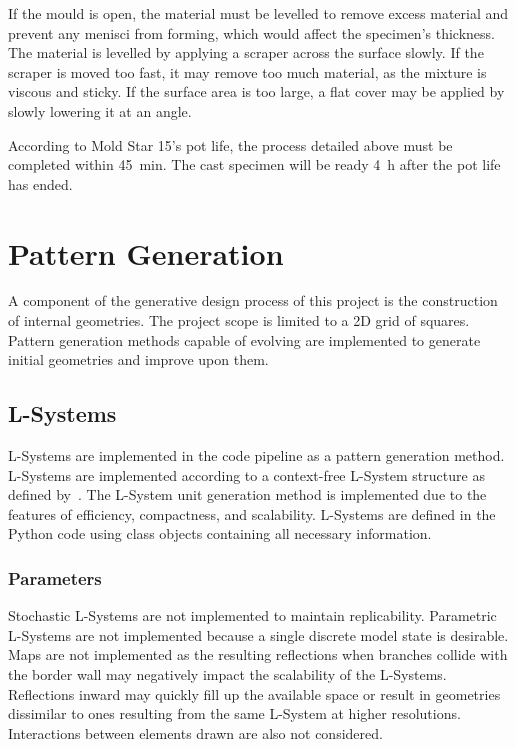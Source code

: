 If the mould is open, the material must be levelled to remove excess material and prevent any menisci from forming, which would affect the specimen's thickness. The material is levelled by applying a scraper across the surface slowly. If the scraper is moved too fast, it may remove too much material, as the mixture is viscous and sticky. If the surface area is too large, a flat cover may be applied by slowly lowering it at an angle.

According to Mold Star 15's pot life, the process detailed above must be completed within \SI{45}{\minute}. The cast specimen will be ready \SI{4}{\hour} after the pot life has ended.

\section{Pattern Generation}

A component of the generative design process of this project is the construction of internal geometries. The project scope is limited to a 2D grid of squares. Pattern generation methods capable of evolving are implemented to generate initial geometries and improve upon them.

\subsection{L-Systems}
\label{ssec:LS}

L-Systems are implemented in the code pipeline as a pattern generation method. L-Systems are implemented according to a context-free L-System structure as defined by~\cite{Prusinkiewicz2004}. The L-System unit generation method is implemented due to the features of efficiency, compactness, and scalability. L-Systems are defined in the Python code using class objects containing all necessary information.

\subsubsection{Parameters}

Stochastic L-Systems are not implemented to maintain replicability. Parametric L-Systems are not implemented because a single discrete model state is desirable. Maps are not implemented as the resulting reflections when branches collide with the border wall may negatively impact the scalability of the L-Systems. Reflections inward may quickly fill up the available space or result in geometries dissimilar to ones resulting from the same L-System at higher resolutions. Interactions between elements drawn are also not considered.

